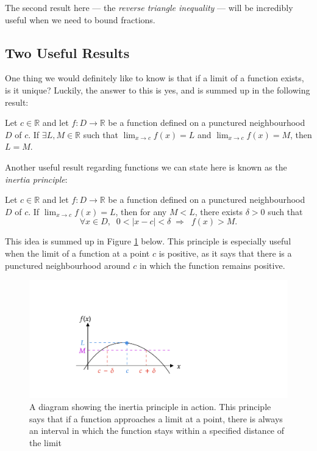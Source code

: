 \documentclass[
  10pt,
  a4paper]{article}
\theoremstyle{plain}
\theoremstyle{definition}
\theoremstyle{plain}
\theoremstyle{plain}
\theoremstyle{plain}
\theoremstyle{plain}
\theoremstyle{definition}
\theoremstyle{definition}
\theoremstyle{remark}
\theoremstyle{remark}
\let\BeginKnitrBlock\begin \let\EndKnitrBlock\end
\begin{document}
The second result here --- the \emph{reverse triangle inequality} --- will be incredibly useful when we need to bound fractions.

\hypertarget{two-useful-results}{%
\subsection{Two Useful Results}\label{two-useful-results}}

One thing we would definitely like to know is that if a limit of a function exists, is it unique? Luckily, the answer to this is yes, and is summed up in the following result:
\BeginKnitrBlock{proposition}[Uniqueness of Limits]
{\label{prp:prop1} }Let \(c\in\mathbb{R}\) and let \(f:D \to \mathbb{R}\) be a function defined on a punctured neighbourhood \(D\) of \(c\). If \(\exists L, M \in \mathbb{R}\) such that \(\lim_{x\to c} f(x) = L\) and \(\lim_{x\to c} f(x) = M\), then \(L=M\).
\EndKnitrBlock{proposition}

Another useful result regarding functions we can state here is known as the \emph{inertia principle}:
\BeginKnitrBlock{proposition}[Inertia]
{\label{prp:prop2} }Let \(c\in\mathbb{R}\) and let \(f:D \to \mathbb{R}\) be a function defined on a punctured neighbourhood \(D\) of \(c\). If \(\lim_{x\to c} f(x) = L\), then for any \(M < L\), there exists \(\delta > 0\) such that \[\forall x \in D,\;\; 0 < \lvert x - c \rvert < \delta \; \Rightarrow \;\; f(x) > M.\]
\EndKnitrBlock{proposition}
This idea is summed up in Figure \ref{fig:inertia} below. This principle is especially useful when the limit of a function at a point \(c\) is positive, as it says that there is a punctured neighbourhood around \(c\) in which the function remains positive.

\begin{figure}
\includegraphics{Inertia} \caption{A diagram showing the inertia principle in action. This principle says that if a function approaches a limit at a point, there is always an interval in which the function stays within a specified distance of the limit}\label{fig:inertia}
\end{figure}
\end{document}
